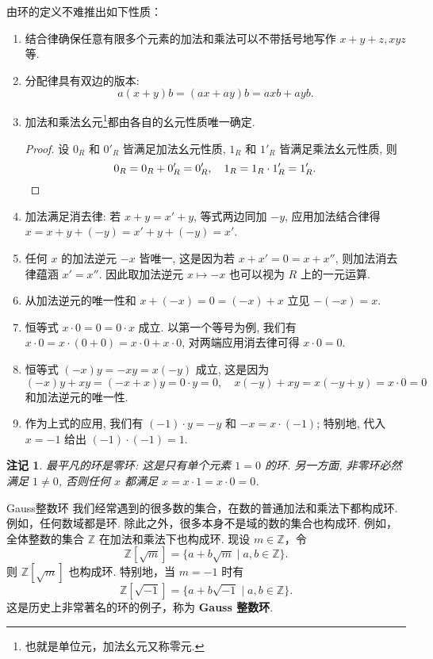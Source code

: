 \documentclass[12pt, a4paper]{ctexart}
\newtheorem*{remark}{{\color{red}\dbend}\textbf{注记}}
\begin{document}
由环的定义不难推出如下性质：
\begin{enumerate}
	\item 结合律确保任意有限多个元素的加法和乘法可以不带括号地写作 $x + y + z, xyz$ 等.
	\item 分配律具有双边的版本:
	\[
	a(x + y)b = (ax + ay)b = axb + ayb.
	\]
	\item 加法和乘法幺元\footnote{也就是单位元，加法幺元又称零元. }都由各自的幺元性质唯一确定. 
	\begin{proof}
		设 $0_R$ 和 $0'_R$ 皆满足加法幺元性质, $1_R$ 和 $1'_R$ 皆满足乘法幺元性质, 则
		\[
		0_R = 0_R + 0'_R = 0'_R, \quad 1_R = 1_R \cdot 1'_R = 1'_R.\qedhere
		\]
	\end{proof}
	\item 加法满足消去律: 若 $x + y = x' + y$, 等式两边同加 $-y$, 应用加法结合律得 $x = x + y + (-y) = x' + y + (-y) = x'$.
	\item 任何 $x$ 的加法逆元 $-x$ 皆唯一, 这是因为若 $x + x' = 0 = x + x''$, 则加法消去律蕴涵 $x' = x''$. 因此取加法逆元 $x \mapsto -x$ 也可以视为 $R$ 上的一元运算.
	\item 从加法逆元的唯一性和 $x + (-x) = 0 = (-x) + x$ 立见 $-(-x) = x$.
	\item 恒等式 $x \cdot 0 = 0 = 0 \cdot x$ 成立. 以第一个等号为例, 我们有$x \cdot 0 = x \cdot (0 + 0) = x \cdot 0 + x \cdot 0$, 对两端应用消去律可得 $x \cdot 0 = 0$.
	\item 恒等式 $(-x)y = -xy = x(-y)$ 成立, 这是因为
	\[
	(-x)y + xy = (-x + x)y = 0 \cdot y = 0, \quad x(-y) + xy = x(-y + y) = x \cdot 0 = 0
	\]
	和加法逆元的唯一性.
	\item 作为上式的应用, 我们有 $(-1) \cdot y = -y$ 和 $-x = x \cdot (-1)$; 特别地, 代入 $x = -1$ 给出 $(-1) \cdot (-1) = 1$.
\end{enumerate}
\begin{remark}
	最平凡的环是零环: 这是只有单个元素 $1 = 0$ 的环. 另一方面, 非零环必然满足 $1 \neq 0$, 否则任何 $x$ 都满足 $x = x \cdot 1 = x \cdot 0 = 0$.
\end{remark}
\begin{example}{Gauss整数环}{}
	我们经常遇到的很多数的集合，在数的普通加法和乘法下都构成环. 例如，任何数域都是环. 除此之外，很多本身不是域的数的集合也构成环. 例如，全体整数的集合 $\mathbb{Z}$ 在加法和乘法下也构成环. 现设 $m \in \mathbb{Z}$，令
	\[
	\mathbb{Z}[\sqrt{m}] = \{ a + b\sqrt{m} \mid a, b \in \mathbb{Z} \}.
	\]
	则 $\mathbb{Z}[\sqrt{m}]$ 也构成环. 特别地，当 $m = -1$ 时有
	\[
	\mathbb{Z}[\sqrt{-1}] = \{ a + b\sqrt{-1} \mid a, b \in \mathbb{Z} \}.
	\]
	这是历史上非常著名的环的例子，称为 \textbf{Gauss 整数环}. 
\end{example}
\end{document}
